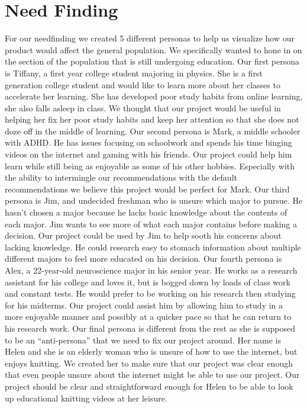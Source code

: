 \documentclass[letterpaper]{article} %
\begin{document}

\section{Need Finding}
For our needfinding we created 5 different personas to help us visualize how our product would affect the general population. We specifically wanted to hone in on the section of the population that is still undergoing education. Our first persona is Tiffany, a first year college student majoring in physics. She is a first generation college student and would like to learn more about her classes to accelerate her learning. She has developed poor study habits from online learning, she also falls asleep in class. We thought that our project would be useful in helping her fix her poor study habits and keep her attention so that she does not doze off in the middle of learning. Our second persona is Mark, a middle schooler with ADHD. He has issues focusing on schoolwork and spends his time binging videos on the internet and gaming with his friends. Our project could help him learn while still being as enjoyable as some of his other hobbies. Especially with the ability to intermingle our recommendations with the default recommendations we believe this project would be perfect for Mark. Our third persona is Jim, and undecided freshman who is unsure which major to pursue. He hasn't chosen a major because he lacks basic knowledge about the contents of each major. Jim wants to see more of what each major contains before making a decision. Our project could be used by Jim to help sooth his concerns about lacking knowledge. He could research easy to stomach information about multiple different majors to feel more educated on his decision. Our fourth persona is Alex, a 22-year-old neuroscience major in his senior year.  He works as a research assistant for his college and loves it, but is bogged down by loads of class work and constant tests. He would prefer to be working on his research then studying for his midterms. Our project could assist him by allowing him to study in a more enjoyable manner and possibly at a quicker pace so that he can return to his research work. Our final persona is different from the rest as she is supposed to be an “anti-persona” that we need to fix our project around. Her name is Helen and she is an elderly woman who is unsure of how to use the internet, but enjoys knitting. We created her to make sure that our project was clear enough that even people unsure about the internet might be able to use our project. Our project should be clear and straightforward enough for Helen to be able to look up educational knitting videos at her leisure. 
\end{document}
